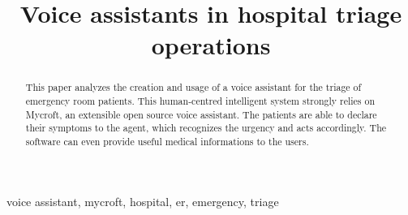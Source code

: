 \documentclass[conference]{IEEEtran}
\begin{document}
\title{Voice assistants in hospital triage operations}

\author{
    \and
    \and
}

\maketitle

\begin{abstract}
    This paper analyzes the creation and usage of a voice assistant for the triage of emergency room patients. This human-centred intelligent system strongly relies on Mycroft, an extensible open source voice assistant. The patients are able to declare their symptoms to the agent, which recognizes the urgency and acts accordingly. The software can even provide useful medical informations to the users.
\end{abstract}

\begin{IEEEkeywords}
    voice assistant, mycroft, hospital, er, emergency, triage
\end{IEEEkeywords}
\end{document}
